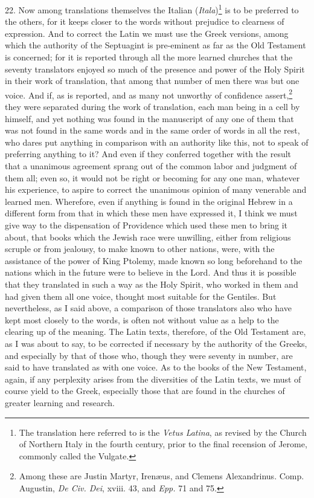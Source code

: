 22. Now among translations themselves the Italian (\emph{Itala})\footnote{The translation here referred to is the \emph{Vetus Latina}, as revised by the Church of Northern Italy in the fourth century, prior to the final recension of Jerome, commonly called the Vulgate.} is to be preferred to the others, for it keeps closer to the words without prejudice to clearness of expression. And to correct the Latin we must use the Greek versions, among which the authority of the Septuagint is pre-eminent as far as the Old Testament is concerned; for it is reported through all the more learned churches that the seventy translators enjoyed so much of the presence and power of the Holy Spirit in their work of translation, that among that number of men there was but one voice. And if, as is reported, and as many not unworthy of confidence assert,\footnote{Among these are Justin Martyr, Irenæus, and Clemens Alexandrinus. Comp. Augustin, \emph{De Civ. Dei}, xviii. 43, and \emph{Epp.} 71 and 75.} they were separated during the work of translation, each man being in a cell by himself, and yet nothing was found in the manuscript of any one of them that was not found in the same words and in the same order of words in all the rest, who dares put anything in comparison with an authority like this, not to speak of preferring anything to it? And even if they conferred together with the result that a unanimous agreement sprang out of the common labor and judgment of them all; even so, it would not be right or becoming for any one man, whatever his experience, to aspire to correct the unanimous opinion of many venerable and learned men. Wherefore, even if anything is found in the original Hebrew in a different form from that in which these men have expressed it, I think we must give way to the dispensation of Providence which used these men to bring it about, that books which the Jewish race were unwilling, either from religious scruple or from jealousy, to make known to other nations, were, with the assistance of the power of King Ptolemy, made known so long beforehand to the nations which in the future were to believe in the Lord. And thus it is possible that they translated in such a way as the Holy Spirit, who worked in them and had given them all one voice, thought most suitable for the Gentiles. But nevertheless, as I said above, a comparison of those translators also who have kept most closely to the words, is often not without value as a help to the clearing up of the meaning. The Latin texts, therefore, of the Old Testament are, as I was about to say, to be corrected if necessary by the authority of the Greeks, and especially by that of those who,  though they were seventy in number, are said to have translated as with one voice. As to the books of the New Testament, again, if any perplexity arises from the diversities of the Latin texts, we must of course yield to the Greek, especially those that are found in the churches of greater learning and research.

